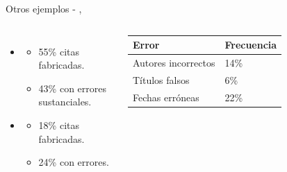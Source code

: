 \begin{frame}{Otros ejemplos - \citeauthor{walters_fabrication_2023},\citeyear{walters_fabrication_2023}}
    \begin{columns}
        \begin{itemize}
            \item {}
                  \begin{itemize}
                      \item 55\% citas fabricadas.
                      \item 43\% con errores sustanciales.
                  \end{itemize}
            \item {}
                  \begin{itemize}
                      \item 18\% citas fabricadas.
                      \item 24\% con errores.
                  \end{itemize}
        \end{itemize}
        \begin{table}[ht]
            \centering
            \footnotesize
            \begin{tabular}{@{}ll@{}}
                \toprule
                \textbf{Error}      & \textbf{Frecuencia} \\
                \midrule
                Autores incorrectos & 14\%                \\
                Títulos falsos      & 6\%                 \\
                Fechas erróneas     & 22\%                \\
                \bottomrule
            \end{tabular}
        \end{table}
    \end{columns}
\end{frame}

